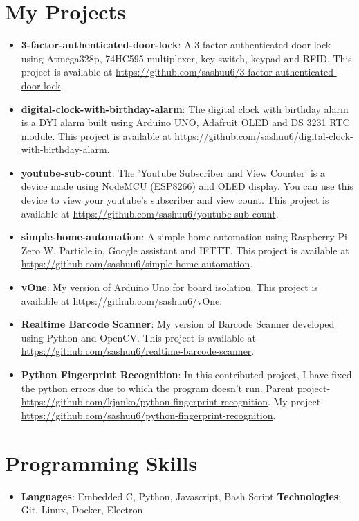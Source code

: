 \documentclass[letterpaper,11pt]{article}
\newcommand{\resumeItem}[2]{
	\item\small{
    		\textbf{#1}{: #2 \vspace{-2pt}}
  	}
}
\newcommand{\resumeSubItem}[2]{\resumeItem{#1}{#2}\vspace{-4pt}}
\newcommand{\resumeSubHeadingListStart}{\begin{itemize}[leftmargin=*]}
\newcommand{\resumeSubHeadingListEnd}{\end{itemize}}
\begin{document}
\section{My Projects}
  	\resumeSubHeadingListStart
    		\resumeSubItem{3-factor-authenticated-door-lock}
      			{ A 3 factor authenticated door lock using Atmega328p, 74HC595 multiplexer, key switch, keypad and RFID. This project is available at \url{https://github.com/sashuu6/3-factor-authenticated-door-lock}.}
    		\resumeSubItem{digital-clock-with-birthday-alarm}
      			{The digital clock with birthday alarm is a DYI alarm built using Arduino UNO, Adafruit OLED and DS 3231 RTC module. This project is available at \url{https://github.com/sashuu6/digital-clock-with-birthday-alarm}.}
    		\resumeSubItem{youtube-sub-count}
      			{The 'Youtube Subscriber and View Counter' is a device made using NodeMCU (ESP8266) and OLED display. You can use this device to view your youtube's subscriber and view count. This project is available at \url{https://github.com/sashuu6/youtube-sub-count}.}
    		\resumeSubItem{simple-home-automation}
      			{A simple home automation using Raspberry Pi Zero W, Particle.io, Google assistant and IFTTT. This project is available at \url{https://github.com/sashuu6/simple-home-automation}.}
      		\resumeSubItem{vOne}
      			{My version of Arduino Uno for board isolation. This project is available at \url{https://github.com/sashuu6/vOne}.}
       		\resumeSubItem{Realtime Barcode Scanner}
      			{My version of Barcode Scanner developed using Python and OpenCV. This project is available at \url{https://github.com/sashuu6/realtime-barcode-scanner}.}
		\resumeSubItem{Python Fingerprint Recognition}
			{In this contributed project, I have fixed the python errors due to which the program doesn't run. Parent project-\url{https://github.com/kjanko/python-fingerprint-recognition}. My project-\url{https://github.com/sashuu6/python-fingerprint-recognition}.}
  	\resumeSubHeadingListEnd

  
\section{Programming Skills}
  	\resumeSubHeadingListStart
    		\item{
      			\textbf{Languages}{: Embedded C, Python, Javascript, Bash Script }
      			\hfill
      			\textbf{Technologies}{: Git, Linux, Docker, Electron }
    		}
  	\resumeSubHeadingListEnd

\end{document}
